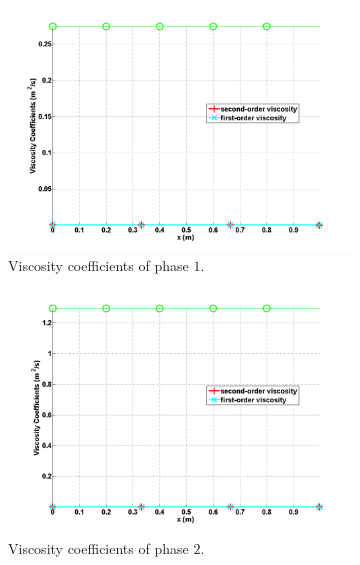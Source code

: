 %
\begin{figure}[H]
        \centering
        \begin{subfigure}[b]{0.495\textwidth}
                \centering
                \includegraphics[width=\textwidth]{figures/SEM/liquid_viscosity.png}
                \caption{Viscosity coefficients of phase $1$.}
                \label{ig:visc-1-7-eqn-sect4}
        \end{subfigure}%
        \begin{subfigure}[b]{0.495\textwidth}
                \centering
                \includegraphics[width=\textwidth]{figures/SEM/vapor_viscosity.png}
                \caption{Viscosity coefficients of phase $2$.}
                \label{fig:visc-2-7-eqn-sect4}
        \end{subfigure}
        \caption{\label{fig:visc-7-sect4}}
\end{figure}
